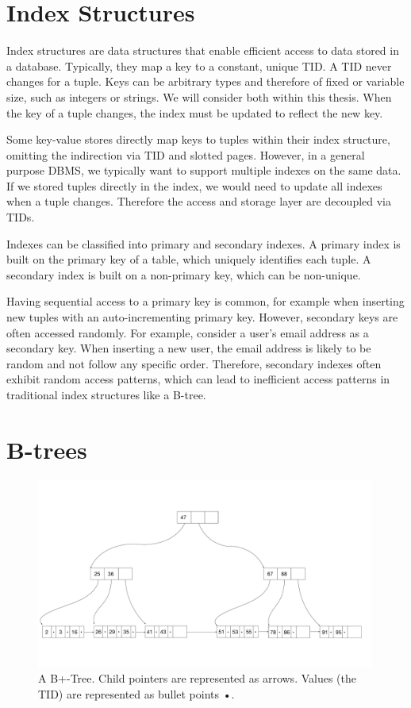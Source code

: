 \section{Index Structures}
Index structures are data structures that enable efficient access to data stored in a database.
Typically, they map a key to a constant, unique \ac{TID}. A \ac{TID} never changes for a tuple.
Keys can be arbitrary types and therefore of fixed or variable size, such as integers or strings.
We will consider both within this thesis.
When the key of a tuple changes, the index must be updated to reflect the new key.

Some key-value stores directly map keys to tuples within their index structure, omitting the indirection via \ac{TID} and slotted pages.
However, in a general purpose \ac{DBMS}, we typically want to support multiple indexes on the same data.
If we stored tuples directly in the index, we would need to update all indexes when a tuple changes.
Therefore the access and storage layer are decoupled via \ac{TID}s.

Indexes can be classified into primary and secondary indexes.
A primary index is built on the primary key of a table, which uniquely identifies each tuple.
A secondary index is built on a non-primary key, which can be non-unique.

Having sequential access to a primary key is common, for example when inserting new tuples with an auto-incrementing primary key.
However, secondary keys are often accessed randomly. For example, consider a user's email address as a secondary key.
When inserting a new user, the email address is likely to be random and not follow any specific order.
Therefore, secondary indexes often exhibit random access patterns, which can lead to inefficient access patterns in traditional index structures like a B-tree.


\section{B-trees}

\begin{figure}[htpb]
  \centering
  \includegraphics[width=0.99\textwidth]{figures/b_tree.pdf}
  \caption{A B+-Tree. Child pointers are represented as arrows. Values (the \ac{TID}) are represented as bullet points •.}
  \label{fig:B-tree}
\end{figure}

